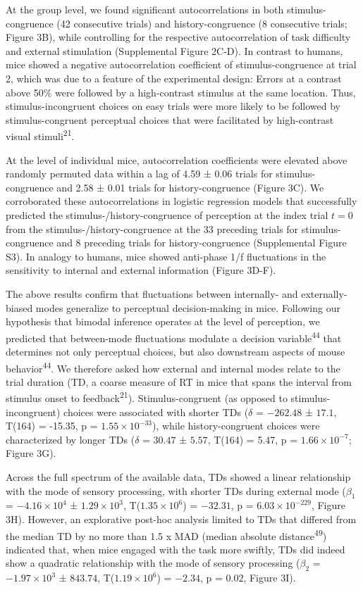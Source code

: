 \documentclass[
]{article}
\begin{document}
At the group level, we found significant autocorrelations in both
stimulus-congruence (42 consecutive trials) and history-congruence (8
consecutive trials; Figure 3B), while controlling for the respective
autocorrelation of task difficulty and external stimulation
(Supplemental Figure 2C-D). In contrast to humans, mice showed a
negative autocorrelation coefficient of stimulus-congruence at trial 2,
which was due to a feature of the experimental design: Errors at a
contrast above 50\% were followed by a high-contrast stimulus at the
same location. Thus, stimulus-incongruent choices on easy trials were
more likely to be followed by stimulus-congruent perceptual choices that
were facilitated by high-contrast visual stimuli\textsuperscript{21}.

At the level of individual mice, autocorrelation coefficients were
elevated above randomly permuted data within a lag of 4.59 ± 0.06 trials
for stimulus-congruence and 2.58 ± 0.01 trials for history-congruence
(Figure 3C). We corroborated these autocorrelations in logistic
regression models that successfully predicted the
stimulus-/history-congruence of perception at the index trial \(t = 0\)
from the stimulus-/history-congruence at the 33 preceding trials for
stimulus-congruence and 8 preceding trials for history-congruence
(Supplemental Figure S3). In analogy to humans, mice showed anti-phase
1/f fluctuations in the sensitivity to internal and external information
(Figure 3D-F).

The above results confirm that fluctuations between internally- and
externally-biased modes generalize to perceptual decision-making in
mice. Following our hypothesis that bimodal inference operates at the
level of perception, we predicted that between-mode fluctuations
modulate a decision variable\textsuperscript{44} that determines not
only perceptual choices, but also downstream aspects of mouse
behavior\textsuperscript{44}. We therefore asked how external and
internal modes relate to the trial duration (TD, a coarse measure of RT
in mice that spans the interval from stimulus onset to
feedback\textsuperscript{21}). Stimulus-congruent (as opposed to
stimulus-incongruent) choices were associated with shorter TDs
(\(\delta\) = \(-262.48\) ± \(17.1\), T(164) = -15.35, p =
\(\ensuremath{1.55\times 10^{-33}}\)), while history-congruent choices
were characterized by longer TDs (\(\delta\) = \(30.47\) ± \(5.57\),
T(164) = 5.47, p = \(\ensuremath{1.66\times 10^{-7}}\); Figure 3G).

Across the full spectrum of the available data, TDs showed a linear
relationship with the mode of sensory processing, with shorter TDs
during external mode (\(\beta_1\) = \(\ensuremath{-4.16\times 10^{4}}\)
± \(\ensuremath{1.29\times 10^{3}}\),
T(\(\ensuremath{1.35\times 10^{6}}\)) = \(-32.31\), p =
\(\ensuremath{6.03\times 10^{-229}}\), Figure 3H). However, an
explorative post-hoc analysis limited to TDs that differed from the
median TD by no more than 1.5 x MAD (median absolute
distance\textsuperscript{49}) indicated that, when mice engaged with the
task more swiftly, TDs did indeed show a quadratic relationship with the
mode of sensory processing (\(\beta_2\) =
\(\ensuremath{-1.97\times 10^{3}}\) ± \(843.74\),
T(\(\ensuremath{1.19\times 10^{6}}\)) = \(-2.34\), p = \(0.02\), Figure
3I).
\end{document}
